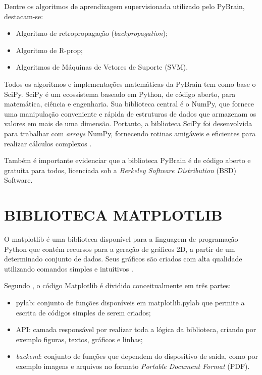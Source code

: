 Dentre os algoritmos de aprendizagem supervisionada utilizado pelo PyBrain, destacam-se:

\begin{itemize}
	\item Algoritmo de retropropagação (\textit{backpropagation});
	\item Algoritmo de R-prop;
	\item Algoritmos de Máquinas de Vetores de Suporte (SVM).
\end{itemize}	

Todos os algoritmos e implementações matemáticas da PyBrain tem como base o SciPy. SciPy é um ecossistema baseado em Python, de código aberto, para matemática, ciência e engenharia. Sua biblioteca central é o NumPy, que fornece uma manipulação conveniente e rápida de estruturas de dados que armazenam os valores em mais de uma dimensão. Portanto, a biblioteca SciPy foi desenvolvida para trabalhar com \textit{arrays} NumPy, fornecendo rotinas amigáveis e eficientes para realizar cálculos complexos \cite{scipy}.

Também é importante evidenciar que a biblioteca PyBrain é de código aberto e gratuita para todos, licenciada sob a \textit{Berkeley Software Distribution} (BSD) Software.

\section{BIBLIOTECA MATPLOTLIB}
O matplotlib é uma biblioteca disponível para a linguagem de programação Python que contém recursos para a geração de gráficos 2D, a partir de um determinado conjunto de dados. Seus gráficos são criados com alta qualidade utilizando comandos simples e intuitivos \cite{matplotlib}.

Segundo , o código Matplotlib é dividido conceitualmente em três partes:
\begin{itemize}
\item pylab: conjunto de funções disponíveis em matplotlib.pylab que permite a escrita de códigos simples de serem criados;
\item API: camada responsável por realizar toda a lógica da biblioteca, criando por exemplo figuras, textos, gráficos e linhas;
\item \textit{backend}: conjunto de funções que dependem do dispositivo de saída, como por exemplo imagens e arquivos no formato \textit{Portable Document Format} (PDF).
\end{itemize}

